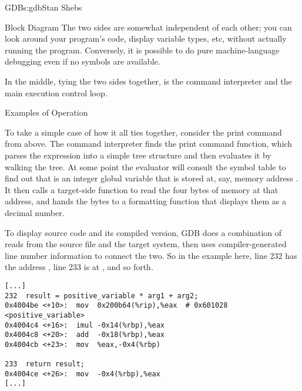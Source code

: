 \begin{aosachapter}{GDB}{s:gdb}{Stan Shebs}
\begin{aosasect1}{Block Diagram}
The two sides are somewhat independent of each other; you can look
around your program's code, display variable types, etc, without
actually running the program.  Conversely, it is possible to do pure
machine-language debugging even if no symbols are available.

In the middle, tying the two sides together, is the command
interpreter and the main execution control loop.

\end{aosasect1}

\begin{aosasect1}{Examples of Operation}

To take a simple case of how it all ties together, consider the print
command from above.  The command interpreter finds the print command
function, which parses the expression into a simple tree structure and
then evaluates it by walking the tree.  At some point the evaluator
will consult the symbol table to find out that
 is an integer global variable that is stored
at, say, memory address .  It then calls a target-side
function to read the four bytes of memory at that address, and hands
the bytes to a formatting function that displays them as a decimal
number.

To display source code and its compiled version, GDB does a
combination of reads from the source file and the target system, then
uses compiler-generated line number information to connect the two.
So in the example here, line 232 has the address , line
233 is at , and so forth.

\begin{verbatim}
[...]
232  result = positive_variable * arg1 + arg2;
0x4004be <+10>:  mov  0x200b64(%rip),%eax  # 0x601028 <positive_variable>
0x4004c4 <+16>:  imul -0x14(%rbp),%eax
0x4004c8 <+20>:  add  -0x18(%rbp),%eax
0x4004cb <+23>:  mov  %eax,-0x4(%rbp)

233  return result;
0x4004ce <+26>:  mov  -0x4(%rbp),%eax
[...]
\end{verbatim}


\end{aosasect1}
\end{aosachapter}
